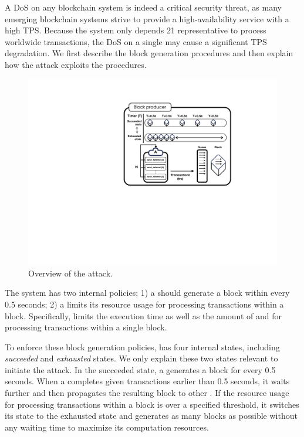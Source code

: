 A DoS on any blockchain system is indeed a critical security threat, as many
emerging blockchain systems strive to provide a high-availability service with
a high TPS.
%
Because the \eos system only depends 21 representative \BPs to process worldwide transactions, the DoS on a single \BP may cause a significant TPS degradation.
%
We first describe the \eos block generation procedures and then explain how
the \NODEDOS attack exploits the procedures.



\begin{figure}[!t] %
\centering
  \includegraphics[width=0.9\linewidth]{figures/BlockDOS.pdf}
  \caption{Overview of the \NODEDOS attack.}
  \label{fig:pow}
\end{figure}

The \eos system has two internal policies; 1) a \BP should generate a block
within every 0.5 seconds; 2) a \BP limits its resource usage for processing
transactions within a block. Specifically, \eos limits the execution time as
well as the amount of \cpu and \net for processing transactions within a single
block.

To enforce these block generation policies, \eos has four internal states,
including \textit{succeeded} and \textit{exhausted} states. We only explain
these two states relevant to initiate the \NODEDOS attack.
%
In the succeeded state, a \BP generates a block for every 0.5 seconds. When a
\BP completes given transactions earlier than 0.5 seconds, it waits further and
then propagates the resulting block to other \BPs.
%
If the resource usage for processing transactions within a block is over a
specified threshold, it switches its state to the exhausted state and generates
as many blocks as possible without any waiting time to maximize its computation
resources.

